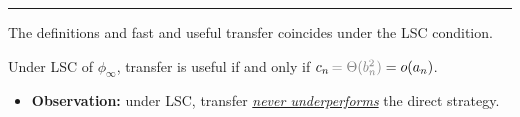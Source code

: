 \begin{frame}
\pause
\vspace{1.5mm}

\vspace{2.5mm}
\hrule
\vspace{1.5mm}

{\small
\color{lightgray!60!black} 
The definitions and fast and useful transfer coincides under the LSC condition.
}

\begin{prop}[\small{\color{FlatironOrange2} [GWB25]} Fast Transfer = Useful Transfer]
Under LSC of $\phi_\infty$, transfer is useful if and only if $c_n {\,\color{lightgray!66!black} = \Theta(b_n^2)} = o(a_n)$. 
\end{prop} 
\vspace{-1mm}

\pause

{
\begin{itemize}\setlength\itemsep{0.1em}
    \item \textbf{Observation:} under LSC, transfer \underline{\textit{never underperforms}} the direct strategy. 
\end{itemize}

}

\end{frame}  

